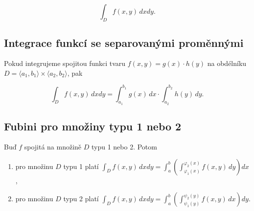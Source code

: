 \[ \int_D f(x,y) \,dxdy. \]

\subsection*{Integrace funkcí se separovanými proměnnými}

Pokud integrujeme spojitou funkci tvaru $f(x,y) = g(x) \cdot h(y)$ na obdélníku
$D = \langle a_1, b_1 \rangle \times \langle a_2, b_2 \rangle$, pak

\[ \int_D f(x,y) \,dxdy = \int_{a_1}^{b_1} g(x)\,dx \cdot \int_{a_2}^{b_2} h(y) \,dy. \]

\subsection*{Fubini pro množiny typu 1 nebo 2}

Buď $f$ spojitá na množině $D$ typu 1 nebo 2. Potom

\begin{enumerate}
    \item pro množinu $D$ typu 1 platí $\displaystyle \int_D f(x,y)\,dxdy = \int_a^b
              \left( \int_{\varphi_1(x)}^{\varphi_2(x)} f(x,y)\,dy \right)dx$,
    \item pro množinu $D$ typu 2 platí $\displaystyle \int_D f(x,y)\,dxdy = \int_a^b
              \left( \int_{\psi_1(y)}^{\psi_2(y)} f(x,y)\,dx \right)dy$.
\end{enumerate}

\pagebreak